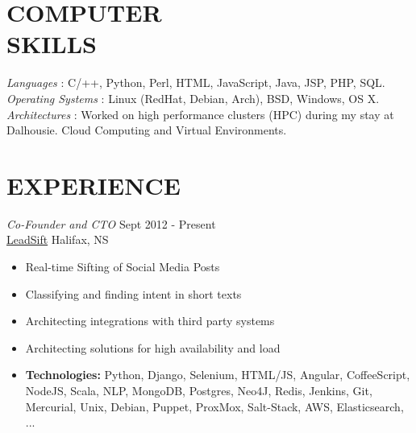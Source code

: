 \documentclass[line,margin]{res}
\begin{document}
\begin{resume}
\section{COMPUTER \\ SKILLS}
    {\sl Languages \hspace{35pt}}:
     C/++, Python, Perl, HTML, JavaScript, Java, JSP, PHP, SQL.\\
    {\sl Operating Systems }:
     Linux (RedHat, Debian, Arch), BSD, Windows, OS X. \\
    {\sl Architectures \hspace{27pt}}:
     Worked on high performance clusters (HPC) during my stay at \\
     \hspace*{92pt} Dalhousie. Cloud Computing and Virtual Environments.

\section{EXPERIENCE}

    {\sl Co-Founder and CTO} \hfill Sept 2012 - Present \\
    \href{http://www.leadsift.com}{LeadSift} \hfill Halifax, NS \smallskip
    \begin{itemize}  \itemsep -2pt %
     \item Real-time Sifting of Social Media Posts
     \item Classifying and finding intent in short texts
     \item Architecting integrations with third party systems
     \item Architecting solutions for high availability and load
     \item {\bf Technologies:} \hspace{1pt}
        Python, Django, Selenium, HTML/JS, Angular, CoffeeScript, \newline
        \hspace*{72pt} NodeJS, Scala, NLP, MongoDB, Postgres, Neo4J, Redis, \newline
        \hspace*{72pt} Jenkins, Git, Mercurial, Unix, Debian, Puppet, ProxMox, \newline
        \hspace*{72pt} Salt-Stack, AWS, Elasticsearch, ...
    \end{itemize}


\end{resume}
\end{document}
